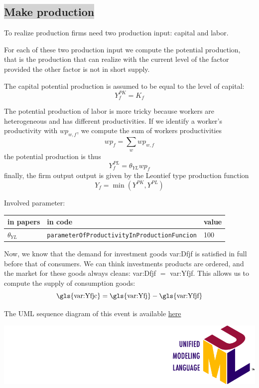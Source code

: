 \documentclass{book}
\newcommand{\doclocation}{file:///Users/giulioni/Documents/workspace/gabriele/docs}
\begin{document}
\subsection*{\colorbox{lightgray}{Make production}}
To realize production firms need two production input: capital and labor.

For each of these two production input we compute the potential production, that is the production that can realize with the current level of the factor provided the other factor is not in short supply.

The capital potential production is assumed to be equal to the level of capital:
\[
	Y^{PK}_f=K_f
\]

The potential production of labor is more tricky because workers are heterogeneous and has different productivities.
If we identify a worker's productivity with $wp_{w,f}$, we compute the sum of workers productivities
\[
	wp_f=\sum_{w}wp_{w,f}
\]
the potential production is thus
\[
	Y^{PL}_f=\theta_{YL}wp_f
\]
finally, the firm output output is given by the Leontief type production function
\[
Y_f=\min(Y^{PK},Y^{PL})
\]

Involved parameter:

\begin{tabular}{l l l}
	\hline
	in papers& in code&value\\
	\hline
	\hline
$\theta_{YL}$&\verb+parameterOfProductivityInProductionFuncion+&100\\
	\hline
\end{tabular}

\vskip2mm
Now, we know that the demand for investment goods \gls{var:Dfjf} is satisfied in full before that of consumers. We can think investments products are ordered, and the market for these goods always cleans: \gls{var:Dfjf} $=$ \gls{var:Yfjf}. This allows us to compute the supply of consumption goods:
\[
	\textnormal{\gls{var:Yfjc}}=\textnormal{\gls{var:Yfj}}-\textnormal{\gls{var:Yfjf}}
\]


\vskip3mm
The UML sequence diagram of this event is available \href{\doclocation/umldoc/makeProduction.html}{here}
\begin{marginfigure}
	\includegraphics[scale=0.1]{uml.png}
\end{marginfigure}
\vskip3mm
\end{document}
